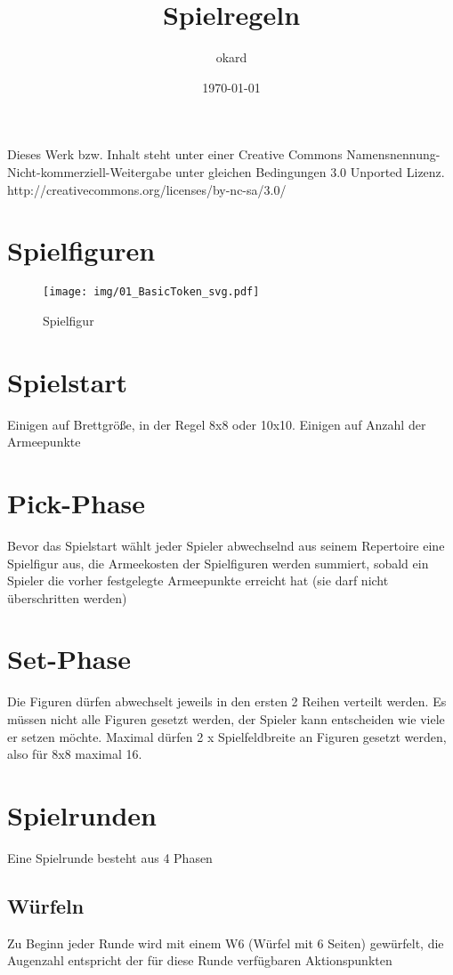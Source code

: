 \documentclass{article}
\title{Spielregeln}
\author{okard}
\date{\today}
\begin{document}
Dieses Werk bzw. Inhalt steht unter einer Creative Commons Namensnennung-Nicht-kommerziell-Weitergabe unter gleichen Bedingungen 3.0 Unported Lizenz.
http://creativecommons.org/licenses/by-nc-sa/3.0/

\section{Spielfiguren}

\begin{figure}[ht]
	\centering
	\texttt{[image: img/01\_BasicToken\_svg.pdf]}
	\caption{Spielfigur}
	\label{Figure1}
\end{figure}


\section{Spielstart}
Einigen auf Brettgröße, in der Regel 8x8 oder 10x10.
Einigen auf Anzahl der Armeepunkte

\section{Pick-Phase}
Bevor das Spielstart wählt jeder Spieler abwechselnd aus seinem Repertoire eine Spielfigur aus, die Armeekosten der Spielfiguren werden summiert, sobald ein Spieler die vorher festgelegte Armeepunkte erreicht hat (sie darf nicht überschritten werden)

\section{Set-Phase}
Die Figuren dürfen abwechselt jeweils in den ersten 2 Reihen verteilt werden. Es müssen nicht alle Figuren gesetzt werden, der Spieler kann entscheiden wie viele er setzen möchte. Maximal dürfen 2 x Spielfeldbreite an Figuren gesetzt werden, also für 8x8 maximal 16.

\section{Spielrunden}

Eine Spielrunde besteht aus 4 Phasen

\subsection{Würfeln}
Zu Beginn jeder Runde wird mit einem W6 (Würfel mit 6 Seiten) gewürfelt, 
die Augenzahl entspricht der für diese Runde verfügbaren Aktionspunkten 
	
\end{document}
